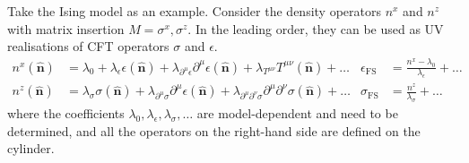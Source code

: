\documentclass{timesjhep}
\begin{document}
Take the Ising model as an example. Consider the density operators $n^x$ and $n^z$ with matrix insertion $M=\sigma^x,\sigma^z$. In the leading order, they can be used as UV realisations of CFT operators $\sigma$ and $\epsilon$.
\begin{align}
    n^x(\hat{\mathbf{n}})&=\lambda_0+\lambda_\epsilon\epsilon(\hat{\mathbf{n}})+\lambda_{\partial^\mu\epsilon}\partial^\mu\epsilon(\hat{\mathbf{n}})+\lambda_{T^{\mu\nu}}T^{\mu\nu}(\hat{\mathbf{n}})+\dots&\epsilon_\textrm{FS}&=\frac{n^x-\lambda_0}{\lambda_\epsilon}+\dots\nonumber\\
    n^z(\hat{\mathbf{n}})&=\lambda_\sigma\sigma(\hat{\mathbf{n}})+\lambda_{\partial^\mu\sigma}\partial^\mu\epsilon(\hat{\mathbf{n}})+\lambda_{\partial^\mu\partial^\nu\sigma}\partial^\mu\partial^\nu\sigma(\hat{\mathbf{n}})+\dots&\sigma_\textrm{FS}&=\frac{n^z}{\lambda_\sigma}+\dots
\end{align}
where the coefficients $\lambda_0,\lambda_\epsilon,\lambda_\sigma,\dots$ are model-dependent and need to be determined, and all the operators on the right-hand side are defined on the cylinder.
\end{document}
